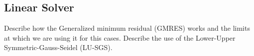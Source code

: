 
\subsection*{Linear Solver}
Describe how the Generalized minimum residual (GMRES) works and the limits at which we are using it for this cases. Describe the use of the Lower-Upper Symmetric-Gauss-Seidel (LU-SGS).
